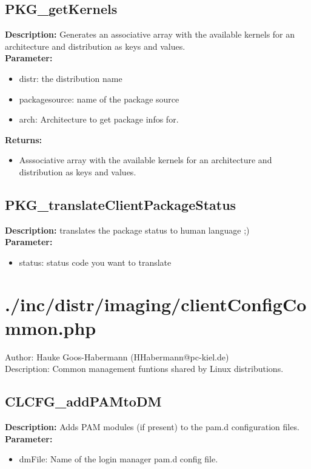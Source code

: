 \subsection{PKG\_getKernels}
\textbf{Description:} Generates an associative array with the available kernels for an architecture and distribution as keys and values.\\
\textbf{Parameter:}
\begin{itemize}
\item distr: the distribution name
\item packagesource: name of the package source
\item arch: Architecture to get package infos for.
\end{itemize}
\textbf{Returns:}
\begin{itemize}
\item Asssociative array with the available kernels for an architecture and distribution as keys and values.
\end{itemize}

\subsection{PKG\_translateClientPackageStatus}
\textbf{Description:} translates the package status to human language ;)\\
\textbf{Parameter:}
\begin{itemize}
\item status: status code you want to translate
\end{itemize}

\newpage\section{./inc/distr/imaging/clientConfigCommon.php}
 Author: Hauke Goos-Habermann (HHabermann@pc-kiel.de)\\
 Description: Common management funtions shared by Linux distributions.\\

\subsection{CLCFG\_addPAMtoDM}
\textbf{Description:} Adds PAM modules (if present) to the pam.d configuration files.\\
\textbf{Parameter:}
\begin{itemize}
\item dmFile: Name of the login manager pam.d config file.
\end{itemize}

